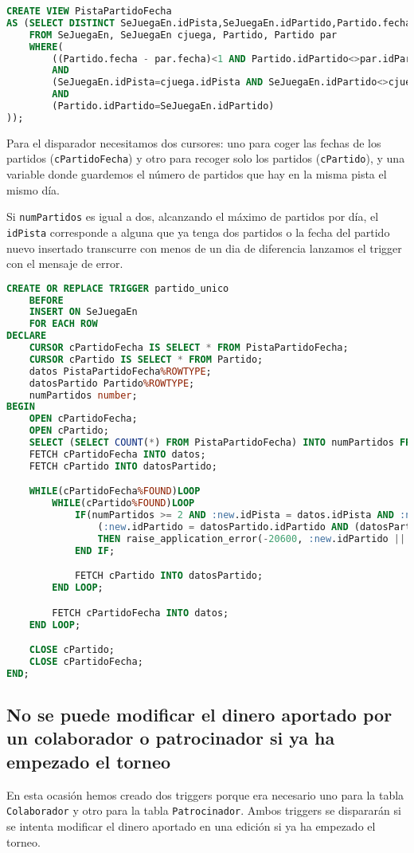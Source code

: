 \begin{lstlisting}[language=sql]
CREATE VIEW PistaPartidoFecha
AS (SELECT DISTINCT SeJuegaEn.idPista,SeJuegaEn.idPartido,Partido.fecha
	FROM SeJuegaEn, SeJuegaEn cjuega, Partido, Partido par
	WHERE(
		((Partido.fecha - par.fecha)<1 AND Partido.idPartido<>par.idPartido)
		AND
		(SeJuegaEn.idPista=cjuega.idPista AND SeJuegaEn.idPartido<>cjuega.idPartido)
		AND
		(Partido.idPartido=SeJuegaEn.idPartido)
));
\end{lstlisting}

Para el disparador necesitamos dos cursores: uno para coger las fechas de los
partidos (\texttt{cPartidoFecha}) y otro para recoger solo los partidos
(\texttt{cPartido}), y una variable donde guardemos el número de partidos que
hay en la misma pista el mismo día.

Si \texttt{numPartidos} es igual a dos, alcanzando el máximo de partidos por
día, el \texttt{idPista} corresponde a alguna que ya tenga dos partidos o la
fecha del partido nuevo insertado transcurre con menos de un dia de diferencia
lanzamos el trigger con el mensaje de error.

\begin{lstlisting}[language=sql]
CREATE OR REPLACE TRIGGER partido_unico
	BEFORE
	INSERT ON SeJuegaEn
	FOR EACH ROW
DECLARE
	CURSOR cPartidoFecha IS SELECT * FROM PistaPartidoFecha;
	CURSOR cPartido IS SELECT * FROM Partido;
	datos PistaPartidoFecha%ROWTYPE;
	datosPartido Partido%ROWTYPE;
	numPartidos number;
BEGIN
	OPEN cPartidoFecha;
	OPEN cPartido;
	SELECT (SELECT COUNT(*) FROM PistaPartidoFecha) INTO numPartidos FROM dual;
	FETCH cPartidoFecha INTO datos;
	FETCH cPartido INTO datosPartido;

	WHILE(cPartidoFecha%FOUND)LOOP
		WHILE(cPartido%FOUND)LOOP
			IF(numPartidos >= 2 AND :new.idPista = datos.idPista AND :new.idPartido <> datos.idPartido AND
				(:new.idPartido = datosPartido.idPartido AND (datosPartido.fecha-datos.fecha) < 1))
				THEN raise_application_error(-20600, :new.idPartido || 'No se jugar más de dos partidos en la misma pista en un mismo dia');
			END IF;

			FETCH cPartido INTO datosPartido;
		END LOOP;

		FETCH cPartidoFecha INTO datos;
	END LOOP;

	CLOSE cPartido;
	CLOSE cPartidoFecha;
END;
\end{lstlisting}

\subsection{No se puede modificar el dinero aportado por un colaborador o patrocinador si ya ha empezado el torneo}
En esta ocasión hemos creado dos triggers porque era necesario uno para la tabla
\texttt{Colaborador} y otro para la tabla \texttt{Patrocinador}. Ambos triggers
se dispararán si se intenta modificar el dinero aportado en una edición si ya ha
empezado el torneo.

